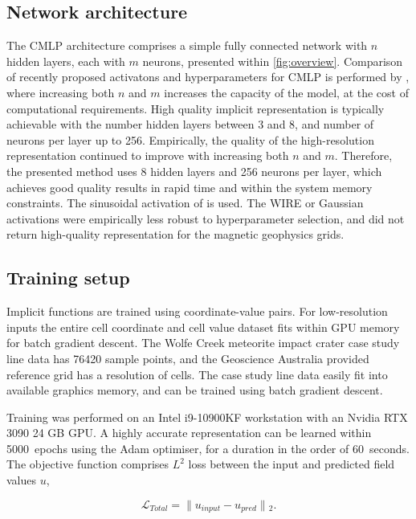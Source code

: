 \documentclass[manuscript.tex]{subfiles}
\begin{document}
\subsection{Network architecture}
The CMLP architecture comprises a simple fully connected network with \(n\) hidden layers, each with \(m\) neurons, presented within \cref{fig:overview}.
Comparison of recently proposed activatons and hyperparameters for CMLP is performed by \textcite{saragadamWIREWaveletImplicit2023}, where increasing both \(n\) and \(m\) increases the capacity of the model, at the cost of computational requirements.
High quality implicit representation is typically achievable with the number hidden layers between \num{3} and \num{8}, and number of neurons per layer up to \num{256}.
Empirically, the quality of the high-resolution representation continued to improve with increasing both \(n\) and \(m\).
Therefore, the presented method uses \num{8} hidden layers and \num{256} neurons per layer, which achieves good quality results in rapid time and within the system memory constraints.
The sinusoidal activation of \textcite{sitzmann2019siren} is used.
The WIRE or Gaussian activations were empirically less robust to hyperparameter selection, and did not return high-quality representation for the magnetic geophysics grids.

\subsection{Training setup}
\label{sec:training}

Implicit functions are trained using coordinate-value pairs.
For low-resolution inputs the entire cell coordinate and cell value dataset fits within GPU memory for batch gradient descent.
The Wolfe Creek meteorite impact crater case study line data has \num{76420} sample points, and the Geoscience Australia provided reference grid has a resolution of  cells.
The case study line data easily fit into available graphics memory, and can be trained using batch gradient descent.

Training was performed on an Intel i9-10900KF workstation with an Nvidia RTX 3090 24 GB GPU\@.
A highly accurate representation can be learned within \qty{5000}{epochs} using the Adam optimiser, for a duration in the order of \qty{60}{seconds}.
The objective function comprises \(L^2\) loss between the input and predicted field values \(u\),

\begin{equation}
    \label{eqn:cri}
    \mathcal{L}_{Total} = \lVert{}u_{input} - u_{pred}\rVert{}_{2}. %
\end{equation}
\end{document}
